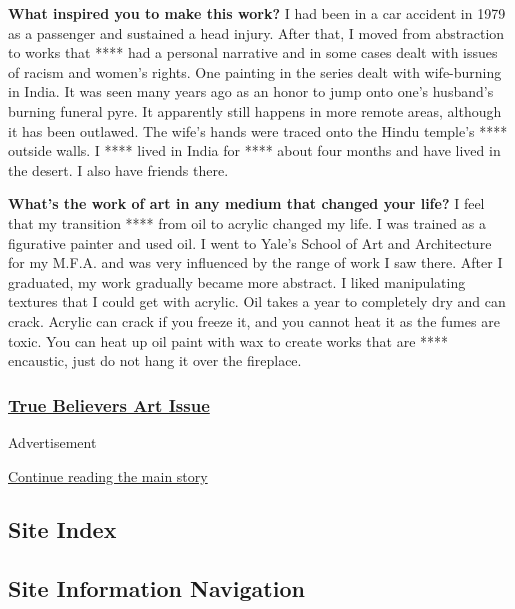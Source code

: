 \textbf{What inspired you to make this work?} I had been in a car
accident in 1979 as a passenger and sustained a head injury. After that,
I moved from abstraction to works that **** had a personal narrative and
in some cases dealt with issues of racism and women's rights. One
painting in the series dealt with wife-burning in India. It was seen
many years ago as an honor to jump onto one's husband's burning funeral
pyre. It apparently still happens in more remote areas, although it has
been outlawed. The wife's hands were traced onto the Hindu temple's ****
outside walls. I **** lived in India for **** about four months and have
lived in the desert. I also have friends there.

\textbf{What's the work of art in any medium that changed your life?} I
feel that my transition **** from oil to acrylic changed my life. I was
trained as a figurative painter and used oil. I went to Yale's School of
Art and Architecture for my M.F.A. and was very influenced by the range
of work I saw there. After I graduated, my work gradually became more
abstract. I liked manipulating textures that I could get with acrylic.
Oil takes a year to completely dry and can crack. Acrylic can crack if
you freeze it, and you cannot heat it as the fumes are toxic. You can
heat up oil paint with wax to create works that are **** encaustic, just
do not hang it over the fireplace.

\hypertarget{true-believers-art-issue}{%
\subsubsection{\texorpdfstring{\href{https://www.nytimes.com/issue/t-magazine/2020/07/02/true-believers-art-issue}{True
Believers Art
Issue}}{True Believers Art Issue}}\label{true-believers-art-issue}}

Advertisement

\protect\hyperlink{after-bottom}{Continue reading the main story}

\hypertarget{site-index}{%
\subsection{Site Index}\label{site-index}}

\hypertarget{site-information-navigation}{%
\subsection{Site Information
Navigation}\label{site-information-navigation}}

